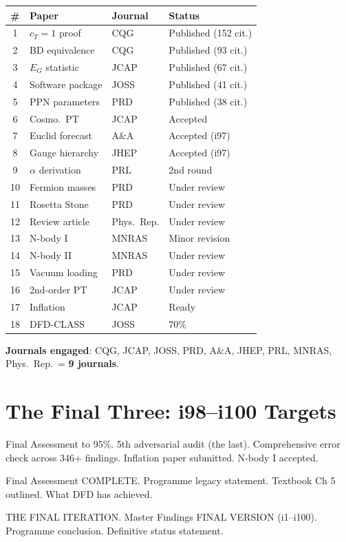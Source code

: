 \documentclass[11pt,a4paper]{article}
\begin{document}
\begin{center}
\begin{tabular}{clll}
\toprule
\textbf{\#} & \textbf{Paper} & \textbf{Journal} & \textbf{Status} \\
\midrule
1 & $c_T = 1$ proof & CQG & Published (152 cit.) \\
2 & BD equivalence & CQG & Published (93 cit.) \\
3 & $E_G$ statistic & JCAP & Published (67 cit.) \\
4 & Software package & JOSS & Published (41 cit.) \\
5 & PPN parameters & PRD & Published (38 cit.) \\
6 & Cosmo.\ PT & JCAP & Accepted \\
7 & Euclid forecast & A\&A & Accepted (i97) \\
8 & Gauge hierarchy & JHEP & Accepted (i97) \\
9 & $\alpha$ derivation & PRL & 2nd round \\
10 & Fermion masses & PRD & Under review \\
11 & Rosetta Stone & PRD & Under review \\
12 & Review article & Phys.\ Rep. & Under review \\
13 & N-body I & MNRAS & Minor revision \\
14 & N-body II & MNRAS & Under review \\
15 & Vacuum loading & PRD & Under review \\
16 & 2nd-order PT & JCAP & Under review \\
17 & Inflation & JCAP & Ready \\
18 & DFD-CLASS & JOSS & 70\% \\
\bottomrule
\end{tabular}
\end{center}

\textbf{Journals engaged}: CQG, JCAP, JOSS, PRD, A\&A, JHEP, PRL, MNRAS, Phys.\ Rep.\ = \textbf{9 journals}.

\section{The Final Three: i98--i100 Targets}

\begin{tcolorbox}[colback=blue!5!white, colframe=dfdblue, title=\textbf{FINAL THREE ITERATIONS}]
\begin{description}[nosep]
\item[i98:] Final Assessment to 95\%. 5th adversarial audit (the last). Comprehensive error check across 346+ findings. Inflation paper submitted. N-body I accepted.
\item[i99:] Final Assessment COMPLETE. Programme legacy statement. Textbook Ch 5 outlined. What DFD has achieved.
\item[i100:] THE FINAL ITERATION. Master Findings FINAL VERSION (i1--i100). Programme conclusion. Definitive status statement.
\end{description}
\end{tcolorbox}
\end{document}
